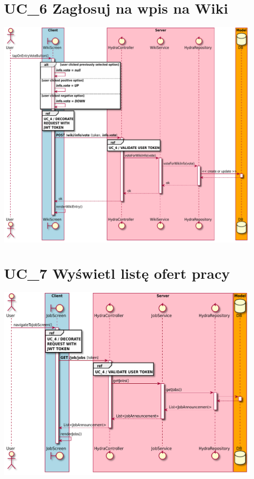 \documentclass[oneside]{scrreprt}
\begin{document}
\section{UC\_6 Zagłosuj na wpis na Wiki}
\includegraphics[width=\textwidth, keepaspectratio]{graphics/sequence_diagram_wiki_vote.pdf}

\section{UC\_7 Wyświetl listę ofert pracy}
\includegraphics[width=\textwidth, keepaspectratio]{graphics/sequence_diagram_job_list.pdf}
\end{document}
